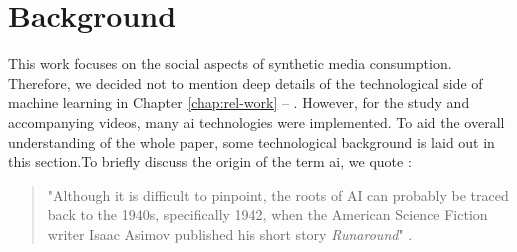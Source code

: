 \documentclass[
  a4paper,  %
  twoside,  %
  bibliography=totoc,
  headsepline,
  cleardoublepage=empty,
  parskip=half,
  draft=false
]{scrbook}
\begin{document}
\chapter{Background}
\label{chap:background}
This work focuses on the social aspects of synthetic media consumption. Therefore, we decided not to mention deep details of the technological side of machine learning in Chapter \ref{chap:rel-work} – . However, for the study and accompanying videos, many \gls{ai} technologies were implemented. To aid the overall understanding of the whole paper, some technological background is laid out in this section.To briefly discuss the origin of the term \gls{ai}, we quote \citeauthor{haenleinBriefHistoryArtificial2019}:

\begin{quotation}
"Although it is difficult to pinpoint, the roots of AI can probably be traced back to the 1940s, specifically 1942, when the American Science Fiction writer Isaac Asimov published his short story \textit{Runaround}" \cite[p. 6]{haenleinBriefHistoryArtificial2019}. 
\end{quotation}
\end{document}
